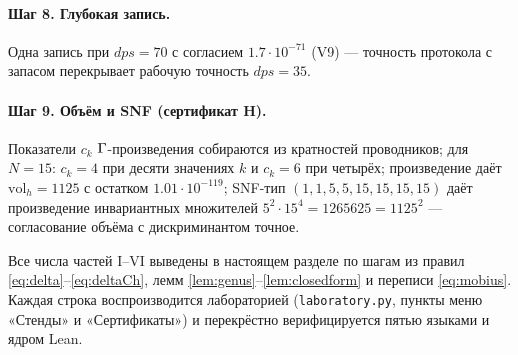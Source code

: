 \paragraph{Шаг 8. Глубокая запись.} Одна запись при $dps=70$
с согласием $1.7\cdot10^{-71}$ (V9) --- точность протокола с
запасом перекрывает рабочую точность $dps=35$.

\paragraph{Шаг 9. Объём и SNF (сертификат H).} Показатели $c_k$
$\Gamma$-произведения собираются из кратностей проводников; для
$N=15$: $c_k=4$ при десяти значениях $k$ и $c_k=6$ при четырёх;
произведение даёт $\mathrm{vol}_h=1125$ с остатком
$1.01\cdot10^{-119}$; SNF-тип $(1,1,5,5,15,15,15,15)$ даёт
произведение инвариантных множителей $5^2\cdot15^4=1265625
=1125^2$ --- согласование объёма с дискриминантом точное.

\begin{statusbox}
Все числа частей I--VI выведены в настоящем разделе по шагам из
правил \eqref{eq:delta}--\eqref{eq:deltaCh}, лемм
\ref{lem:genus}--\ref{lem:closedform} и переписи
\eqref{eq:mobius}. Каждая строка воспроизводится лабораторией
(\texttt{laboratory.py}, пункты меню «Стенды» и «Сертификаты») и
перекрёстно верифицируется пятью языками и ядром Lean.
\end{statusbox}
